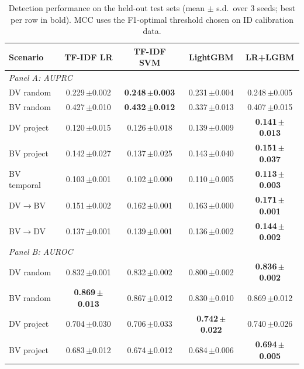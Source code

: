 \begin{table}[t]
\centering\small
\caption{Detection performance on the held-out test sets (mean $\pm$ s.d.\ over 3 seeds; best per row in bold). MCC uses the F1-optimal threshold chosen on ID calibration data.}\label{tab:detect}
\begin{tabular}{lcccc}
\toprule
Scenario & TF-IDF LR & TF-IDF SVM & LightGBM & LR+LGBM \\
\midrule
\multicolumn{5}{l}{\emph{Panel A: AUPRC}} \\
DV random & 0.229\,{\scriptsize$\pm$0.002} & \textbf{0.248\,{\scriptsize$\pm$0.003}} & 0.231\,{\scriptsize$\pm$0.004} & 0.248\,{\scriptsize$\pm$0.005} \\
BV random & 0.427\,{\scriptsize$\pm$0.010} & \textbf{0.432\,{\scriptsize$\pm$0.012}} & 0.337\,{\scriptsize$\pm$0.013} & 0.407\,{\scriptsize$\pm$0.015} \\
DV project & 0.120\,{\scriptsize$\pm$0.015} & 0.126\,{\scriptsize$\pm$0.018} & 0.139\,{\scriptsize$\pm$0.009} & \textbf{0.141\,{\scriptsize$\pm$0.013}} \\
BV project & 0.142\,{\scriptsize$\pm$0.027} & 0.137\,{\scriptsize$\pm$0.025} & 0.143\,{\scriptsize$\pm$0.040} & \textbf{0.151\,{\scriptsize$\pm$0.037}} \\
BV temporal & 0.103\,{\scriptsize$\pm$0.001} & 0.102\,{\scriptsize$\pm$0.000} & 0.110\,{\scriptsize$\pm$0.005} & \textbf{0.113\,{\scriptsize$\pm$0.003}} \\
DV$\to$BV & 0.151\,{\scriptsize$\pm$0.002} & 0.162\,{\scriptsize$\pm$0.001} & 0.163\,{\scriptsize$\pm$0.000} & \textbf{0.171\,{\scriptsize$\pm$0.001}} \\
BV$\to$DV & 0.137\,{\scriptsize$\pm$0.001} & 0.139\,{\scriptsize$\pm$0.001} & 0.136\,{\scriptsize$\pm$0.002} & \textbf{0.144\,{\scriptsize$\pm$0.002}} \\
\midrule
\multicolumn{5}{l}{\emph{Panel B: AUROC}} \\
DV random & 0.832\,{\scriptsize$\pm$0.001} & 0.832\,{\scriptsize$\pm$0.002} & 0.800\,{\scriptsize$\pm$0.002} & \textbf{0.836\,{\scriptsize$\pm$0.002}} \\
BV random & \textbf{0.869\,{\scriptsize$\pm$0.013}} & 0.867\,{\scriptsize$\pm$0.012} & 0.830\,{\scriptsize$\pm$0.010} & 0.869\,{\scriptsize$\pm$0.012} \\
DV project & 0.704\,{\scriptsize$\pm$0.030} & 0.706\,{\scriptsize$\pm$0.033} & \textbf{0.742\,{\scriptsize$\pm$0.022}} & 0.740\,{\scriptsize$\pm$0.026} \\
BV project & 0.683\,{\scriptsize$\pm$0.012} & 0.674\,{\scriptsize$\pm$0.012} & 0.684\,{\scriptsize$\pm$0.006} & \textbf{0.694\,{\scriptsize$\pm$0.005}} \\

\end{tabular}
\end{table}

